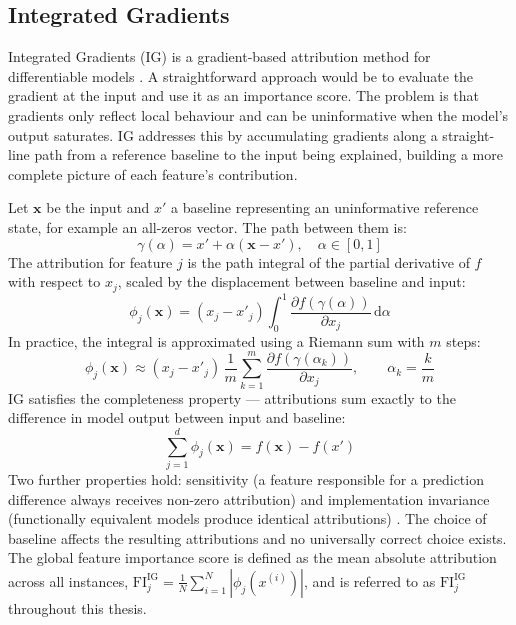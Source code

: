 \subsection{Integrated Gradients}

Integrated Gradients (IG) is a gradient-based attribution method for differentiable models \citep{sundararajan2017axiomaticattributiondeepnetworks}. A straightforward approach would be to evaluate the gradient at the input and use it as an importance score. The problem is that gradients only reflect local behaviour and can be uninformative when the model's output saturates. IG addresses this by accumulating gradients along a straight-line path from a reference baseline to the input being explained, building a more complete picture of each feature's contribution.

Let $\mathbf{x}$ be the input and $x'$ a baseline representing an uninformative reference state, for example an all-zeros vector. The path between them is:
%
\begin{equation}
    \gamma(\alpha) = x' + \alpha(\mathbf{x} - x'), \quad \alpha \in [0, 1]
    \label{eq:ig_path}
\end{equation}
%
The attribution for feature $j$ is the path integral of the partial derivative of $f$ with respect to $x_j$, scaled by the displacement between baseline and input:
%
\begin{equation}
    \phi_j(\mathbf{x}) = (x_j - x'_j) \int_0^1 \frac{\partial f(\gamma(\alpha))}{\partial x_j} \, \mathrm{d}\alpha
    \label{eq:ig_attr}
\end{equation}
%
In practice, the integral is approximated using a Riemann sum with $m$ steps:
%
\begin{equation}
    \phi_j(\mathbf{x}) \approx (x_j - x'_j)\, \frac{1}{m} \sum_{k=1}^{m} \frac{\partial f(\gamma(\alpha_k))}{\partial x_j}, \qquad \alpha_k = \frac{k}{m}
    \label{eq:ig_riemann}
\end{equation}
%
IG satisfies the completeness property — attributions sum exactly to the difference in model output between input and baseline:
%
\begin{equation}
    \sum_{j=1}^{d} \phi_j(\mathbf{x}) = f(\mathbf{x}) - f(x')
    \label{eq:ig_completeness}
\end{equation}
%
Two further properties hold: sensitivity (a feature responsible for a prediction difference always receives non-zero attribution) and implementation invariance (functionally equivalent models produce identical attributions) \citep{sundararajan2017axiomaticattributiondeepnetworks}. The choice of baseline affects the resulting attributions and no universally correct choice exists. The global feature importance score is defined as the mean absolute attribution across all instances, $\text{FI}^{\text{IG}}_j = \frac{1}{N}\sum_{i=1}^{N}|\phi_j(x^{(i)})|$, and is referred to as $\text{FI}^{\text{IG}}_j$ throughout this thesis.



